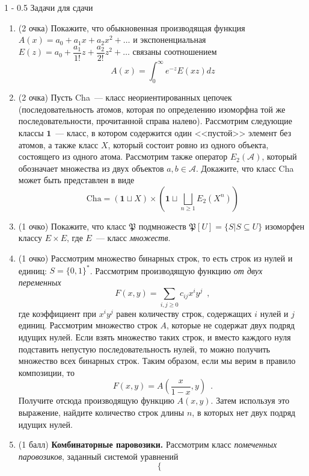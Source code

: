 \documentclass[a5paper]{article}
\makeatletter
\theoremstyle{definition}
\renewcommand{\subsection}{\@startsection
{subsection}%
{1}%
{\z@}%
{-\baselineskip}%
{0.5\baselineskip}%
{\centering\large\scshape}} %
\makeatother
\begin{document}
\subsection{Задачи для сдачи}
\begin{enumerate}
\item(2 очка) Покажите, что обыкновенная производящая функция \( A(x) = a_0 + 
a_1 x + a_2 x^2 + \ldots \) и экспоненциальная \( E(z) = a_0 + \dfrac{a_1}{1!}z 
+ \dfrac{a_2}{2!}z^2 + \ldots \) связаны соотношением
\[
	A(x) = \int_{0}^{\infty} e^{-z} E(xz) dz
\]
\item(2 очка) Пусть Cha~--- класс неориентированных 
цепочек (последовательность атомов, которая по определению изоморфна той же 
последовательности, прочитанной справа налево). Рассмотрим следующие классы \( 
\mathbf{1} 
\)~--- класс, в котором содержится один <<пустой>> элемент без атомов, а также 
класс \( X \), который состоит ровно из одного объекта, состоящего из одного 
атома. Рассмотрим также
оператор \( E_2(\mathcal A) \), который обозначает множества из двух объектов 
\( a, b \in \mathcal A \). Докажите, что класс Cha может быть представлен в виде
\[
	\mathrm{Cha} = (\mathbf{1} \sqcup X) \times \left(\mathbf{1} \sqcup 
	\bigsqcup_{n \geq 1} 
	E_2(X^n)\right)
\]
\item(1 очко) Покажите, что класс \( \mathfrak P \) подмножеств \( \mathfrak 
P[U] = \{ S | S \subseteq U \} \) изоморфен классу \( E \times E \), где \( E 
\)~--- класс \textit{множеств}.
\item(1 очко) Рассмотрим множество бинарных строк, то есть строк из нулей и 
единиц: \( S = \{0, 1\}^{\ast} \). Рассмотрим производящую функцию \textit{от 
двух переменных}
\[
	F(x, y) = \sum_{i, j \geq 0} c_{ij} x^i y^j \enspace ,
\]
где коэффициент при \( x^i y^j \) равен количеству строк, содержащих \( i \) 
нулей и \( j \) единиц. Рассмотрим множество строк \( A \), которые не содержат 
двух подряд идущих нулей. Если взять множество таких строк, и вместо каждого 
нуля подставить непустую последовательность нулей, то можно получить множество 
всех бинарных строк. Таким образом, если мы верим в правило композиции, то
\[
	F(x, y) = A\left(\dfrac{x}{1-x}, y\right ) \enspace .
\]
Получите отсюда производящую функцию \( A(x, y) \). Затем используя это 
выражение, найдите количество строк длины \( n \), в которых нет двух подряд 
идущих нулей.
\item(1 балл) \textbf{Комбинаторные паровозики.} Рассмотрим класс 
\textit{помеченных паровозиков}, заданный системой уравнений
\[
	\begin{cases}

\end{cases}\]
\end{enumerate}
\end{document}
